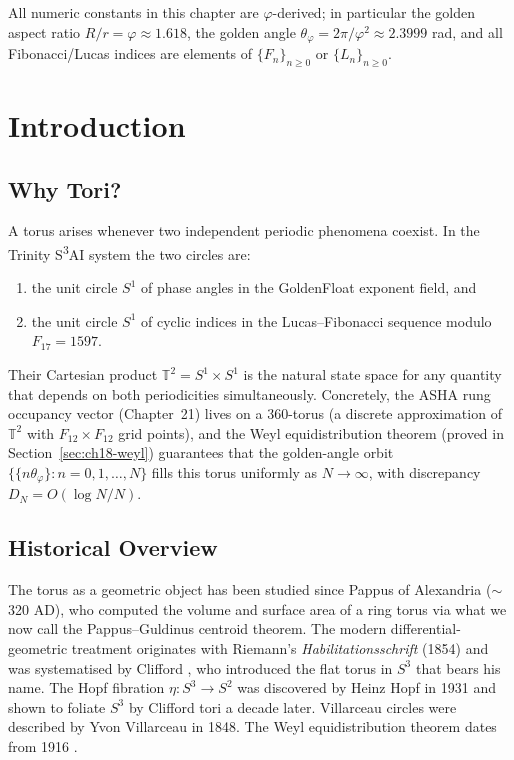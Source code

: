All numeric constants in this chapter are $\varphi$-derived; in particular the
golden aspect ratio $R/r = \varphi \approx 1.618$, the golden angle
$\theta_\varphi = 2\pi/\varphi^2 \approx 2.3999$ rad, and all Fibonacci/Lucas
indices are elements of $\{F_n\}_{n \ge 0}$ or $\{L_n\}_{n \ge 0}$.

\section{Introduction}\label{sec:ch18-intro}

\subsection{Why Tori?}\label{subsec:ch18-why-tori}

A torus arises whenever two independent periodic phenomena coexist.
In the Trinity S\textsuperscript{3}AI system the two circles are:
\begin{enumerate}
\item the unit circle $S^1$ of phase angles in the GoldenFloat exponent field, and
\item the unit circle $S^1$ of cyclic indices in the Lucas--Fibonacci sequence
      modulo $F_{17} = 1597$.
\end{enumerate}
Their Cartesian product $\mathbb{T}^2 = S^1 \times S^1$ is the natural state
space for any quantity that depends on both periodicities simultaneously.
Concretely, the ASHA rung occupancy vector (Chapter~21) lives on a
$360$-torus (a discrete approximation of $\mathbb{T}^2$ with $F_{12} \times F_{12}$
grid points), and the Weyl equidistribution theorem (proved in
Section~\ref{sec:ch18-weyl}) guarantees that the golden-angle orbit
$\{\{n\theta_\varphi\} : n = 0,1,\ldots,N\}$ fills this torus uniformly as
$N \to \infty$, with discrepancy $D_N = O(\log N / N)$.

\subsection{Historical Overview}\label{subsec:ch18-history}

The torus as a geometric object has been studied since Pappus of Alexandria
($\sim$320 AD), who computed the volume and surface area of a ring torus via
what we now call the Pappus--Guldinus centroid theorem.
The modern differential-geometric treatment originates with Riemann's
\emph{Habilitationsschrift} (1854) and was systematised by
Clifford \cite{Clifford1873}, who introduced the flat torus in $S^3$ that
bears his name.
The Hopf fibration $\eta: S^3 \to S^2$ was discovered by Heinz Hopf in
1931 \cite{Hopf1931} and shown to foliate $S^3$ by Clifford tori a decade later.
Villarceau circles were described by Yvon Villarceau in 1848.
The Weyl equidistribution theorem dates from 1916 \cite{Weyl1916}.

